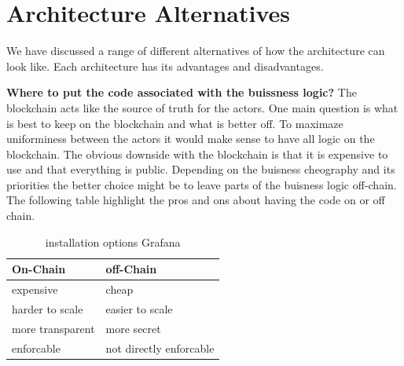 \documentclass[runningheads]{llncs}
\begin{document}

\section{Architecture Alternatives}
We have discussed a range of different alternatives of how the architecture can look like. Each architecture has its advantages and disadvantages.

\textbf{Where to put the code associated with the buissness logic?}
The blockchain acts like the source of truth for the actors. One main question is what is best to keep on the blockchain and what is better off. To maximaze uniforminess between the actors it would make sense to have all logic on the blockchain. The obvious downside with the blockchain is that it is expensive to use and that everything is public. Depending on the buisness cheography and its priorities the better choice might be to leave parts of the buisness logic off-chain. The following table highlight the pros and ons about having the code on or off chain.

\begin{table}[t]
  \centering
  \begin{tabular}{p{6cm}p{6cm}}
  \hline
    \textbf{On-Chain} & \textbf{off-Chain}\\
    \hline \hline
    
 expensive & cheap \\
     harder to scale & easier to scale \\
     more transparent & more secret \\
     enforcable & not directly enforcable \\

\hline
  \end{tabular}
  \caption{installation options Grafana }
  \label{tab:1}
\end{table}
\end{document}
